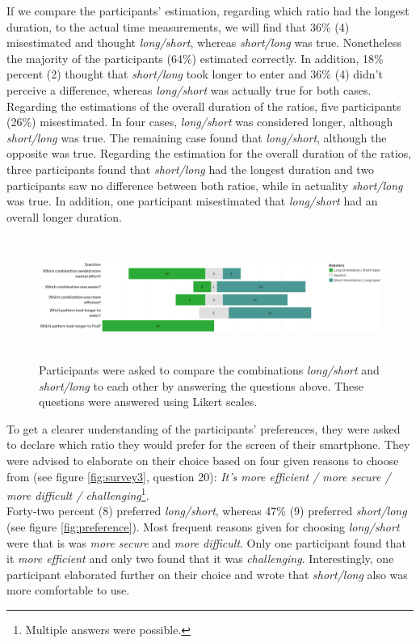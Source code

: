 If we compare the participants' estimation, regarding which ratio had the longest duration, to the actual time measurements, we will find that 36\% (4) misestimated and thought \textit{long/short}, whereas \textit{short/long} was true. Nonetheless the majority of the participants (64\%) estimated correctly. In addition, 18\% percent (2) thought that \textit{short/long} took longer to enter and 36\% (4) didn't perceive a difference, whereas \textit{long/short} was actually true for both cases. Regarding the estimations of the overall duration of the ratios, five participants (26\%) misestimated. In four cases, \textit{long/short} was considered longer, although \textit{short/long} was true. The remaining case found that \textit{long/short}, although the opposite was true. Regarding the estimation for the overall duration of the ratios, three participants found that \textit{short/long} had the longest duration and two participants saw no difference between both ratios, while in actuality \textit{short/long} was true. In addition, one participant misestimated that \textit{long/short} had an overall longer duration.\\

\begin{figure}[t!]
\centering
\includegraphics[width=15cm, height=4cm]{Chapters/graphics/Likert2.png}
\caption{Participants were asked to compare the combinations \textit{long/short} and \textit{short/long} to each other by answering the questions above. These questions were answered using Likert scales. }
\label{fig:likert2}
\end{figure}

To get a clearer understanding of the participants' preferences, they were asked to declare which ratio they would prefer for the screen of their smartphone. They were advised to elaborate on their choice based on four given reasons to choose from (see figure \ref{fig:survey3}, question 20): \textit{It's more efficient / more secure / more difficult / challenging}\footnote{Multiple answers were possible.}.\\
Forty-two percent (8) preferred \textit{long/short}, whereas 47\% (9) preferred \textit{short/long} (see figure \ref{fig:preference}). Most frequent reasons given for choosing \textit{long/short} were that is was \textit{more secure} and \textit{more difficult}. Only one participant found that it \textit{more efficient} and only two found that it was \textit{challenging}. Interestingly, one participant elaborated further on their choice and wrote that \textit{short/long} also was more comfortable to use.\\

